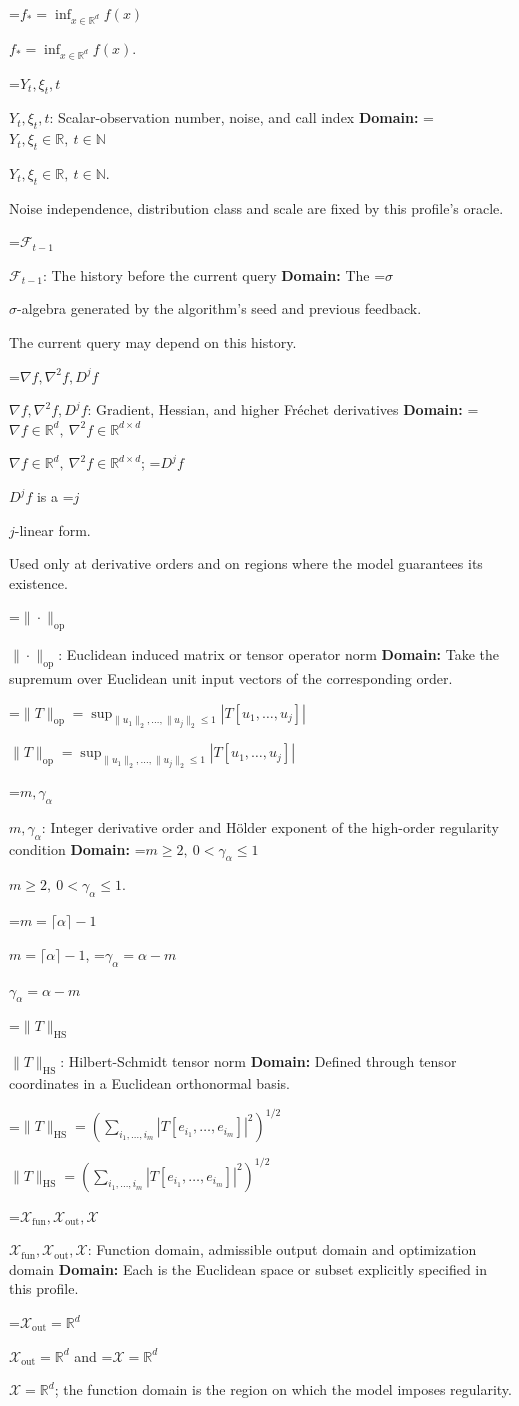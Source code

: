 \documentclass[10pt,a4paper]{article}
\newcommand{\AtlasMath}[1]{\par\begingroup\centering\setbox0=\hbox{$\displaystyle #1$}\ifdim\wd0>1.4\linewidth\typeout{ATLAS WIDE FORMULA: \the\wd0}\fi\ifdim\wd0>\linewidth\resizebox{\linewidth}{!}{\box0}\else\box0\fi\par\endgroup}
\newcommand{\AtlasInlineMath}[1]{\begingroup\setbox0=\hbox{$#1$}\ifdim\wd0>.4\linewidth\endgroup\AtlasMath{#1}\else\endgroup$#1$\fi}
\begin{document}
\AtlasInlineMath{f_*=\inf_{x\in \mathbb{R}^d}f(x)}.

\AtlasInlineMath{Y_t,\xi_t,t}: Scalar-observation number, noise, and call index \textbf{Domain:} \AtlasInlineMath{Y_t,\xi_t\in\mathbb{R},\ t\in\mathbb{N}}.

Noise independence, distribution class and scale are fixed by this profile's oracle.

\AtlasInlineMath{\mathcal{F}_{t-1}}: The history before the current query \textbf{Domain:} The \AtlasInlineMath{\sigma}-algebra generated by the algorithm's seed and previous feedback.

The current query may depend on this history.

\AtlasInlineMath{\nabla f,\nabla^2f,D^jf}: Gradient, Hessian, and higher Fréchet derivatives \textbf{Domain:} \AtlasInlineMath{\nabla f\in\mathbb{R}^d,\ \nabla^2f\in\mathbb{R}^{d\times d}}; \AtlasInlineMath{D^jf} is a \AtlasInlineMath{j}-linear form.

Used only at derivative orders and on regions where the model guarantees its existence.

\AtlasInlineMath{\|\cdot\|_{\mathrm{op}}}: Euclidean induced matrix or tensor operator norm \textbf{Domain:} Take the supremum over Euclidean unit input vectors of the corresponding order.

\AtlasInlineMath{\|T\|_{\mathrm{op}}=\sup_{\|u_1\|_2,\ldots,\|u_j\|_2\le1}|T[u_1,\ldots,u_j]|}

\AtlasInlineMath{m,\gamma_\alpha}: Integer derivative order and Hölder exponent of the high-order regularity condition \textbf{Domain:} \AtlasInlineMath{m\ge2,\ 0<\gamma_\alpha\le1}.

\AtlasInlineMath{m=\lceil\alpha\rceil-1}, \AtlasInlineMath{\gamma_\alpha=\alpha-m}

\AtlasInlineMath{\|T\|_{\mathrm{HS}}}: Hilbert-Schmidt tensor norm \textbf{Domain:} Defined through tensor coordinates in a Euclidean orthonormal basis.

\AtlasInlineMath{\|T\|_{\mathrm{HS}}=(\sum_{i_1,\ldots,i_m}|T[e_{i_1},\ldots,e_{i_m}]|^2)^{1/2}}

\AtlasInlineMath{\mathcal{X}_{\mathrm{fun}},\mathcal{X}_{\mathrm{out}},\mathcal{X}}: Function domain, admissible output domain and optimization domain \textbf{Domain:} Each is the Euclidean space or subset explicitly specified in this profile.

\AtlasInlineMath{\mathcal{X}_{\mathrm{out}}=\mathbb{R}^d} and \AtlasInlineMath{\mathcal{X}=\mathbb{R}^d}; the function domain is the region on which the model imposes regularity.
\end{document}
